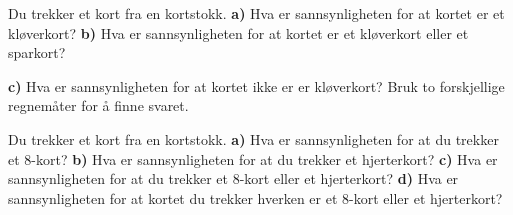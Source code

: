 



\opgt

\nes 

Du trekker et kort fra en kortstokk.\os
\textbf{a)} Hva er sannsynligheten for at kortet er et kløverkort?\os
\textbf{b)} Hva er sannsynligheten for at kortet er et kløverkort eller et sparkort?\os

\textbf{c)} Hva er sannsynligheten for at kortet ikke er er kløverkort? Bruk to forskjellige regnemåter for å finne svaret.

Du trekker et kort fra en kortstokk.\os
\textbf{a)} Hva er sannsynligheten for at du trekker et 8-kort?\os
\textbf{b)} Hva er sannsynligheten for at du trekker et hjerterkort?\os
\textbf{c)} Hva er sannsynligheten for at du trekker et 8-kort eller et hjerterkort?\os
\textbf{d)} Hva er sannsynligheten for at kortet du trekker hverken er et 8-kort eller et hjerterkort?





